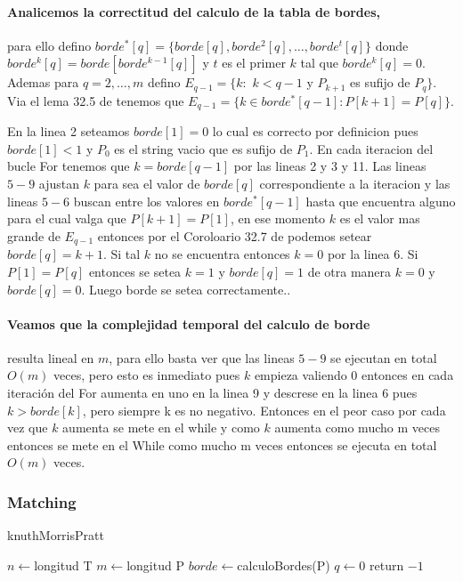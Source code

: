 	\paragraph{Analicemos la correctitud del calculo de la tabla de bordes,} 
		para ello defino $borde^*[q] = \{borde[q],borde^2[q],\dots , borde^t[q]\}$ 
		donde $borde^k[q] = borde[borde^{k-1}[q]]$ y $t$ es el primer
		$k$ tal que $borde^k[q]=0$. Ademas para $q=2,\dots ,m$ defino
		$E_{q-1}=\{k:$ $k<q-1$ y $P_{k+1}$ es sufijo de $P_q  \}$. Via el
		lema 32.5 de \cite{cormen} tenemos que $E_{q-1}=\{k\in borde^*[q-1]:P[k+1]=P[q]\}$.
		
		
		En la linea 2 seteamos $borde[1]=0$ lo cual es correcto por 
		definicion pues $borde[1]<1$ y $P_0$ es el string vacio que
		es sufijo de $P_1$. En cada iteracion del bucle For tenemos que
		$k=borde[q-1]$ por las lineas 2 y 3 y 11. Las lineas $5-9$ ajustan
		$k$ para sea el valor de $borde[q]$ correspondiente a la iteracion
		y las lineas $5-6$ buscan entre los valores en $borde^*[q-1]$ hasta
		que encuentra alguno para el cual valga que $P[k+1]=P[1]$, en ese
		momento $k$ es el valor mas grande de $E_{q-1}$ entonces por el
		Coroloario 32.7 de \cite{cormen} podemos setear $borde[q]=k+1$. Si tal
		$k$ no se encuentra entonces $k=0$ por la linea $6$. Si $P[1]=P[q]$ entonces
		se setea $k=1$ y $borde[q]=1$ de otra manera $k=0$ y $borde[q]=0$. Luego
		borde se setea correctamente..
		
	\paragraph{Veamos que la complejidad temporal del calculo de borde}
		resulta lineal en $m$, para ello basta ver
		que las lineas $5-9$ se ejecutan en total $O(m)$ veces, pero esto
		es inmediato pues $k$ empieza valiendo 0 entonces en cada iteraci\'on
		del For aumenta en uno en la linea 9 y descrese en la linea 6 pues $k>borde[k]$,
		pero siempre k es no negativo.
		Entonces en el peor caso por cada vez que $k$ aumenta se mete en el while
		y como $k$ aumenta como mucho m veces entonces se mete en el While
		como mucho m veces entonces se ejecuta en total $O(m)$ veces.
	
	
	\subsubsection{Matching}
	\incmargin{1em}
	\linesnumbered
	\begin{algorithm}[h]
	\caption{knuthMorrisPratt}
	\BlankLine
			$n\leftarrow$longitud T\;
			$m\leftarrow$longitud P\;
			$borde\leftarrow$calculoBordes(P)\;
			$q\leftarrow 0$\;
			return $-1$ \;
	\end{algorithm}
	\decmargin{1em}
	
